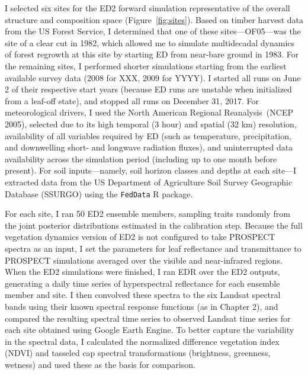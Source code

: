 I selected six sites for the ED2 forward simulation representative of the overall structure and composition space (Figure~\ref{fig:sites}). %
Based on timber harvest data from the US Forest Service, I determined that one of these sites---OF05---was the site of a clear cut in 1982, which allowed me to simulate multidecadal dynamics of forest regrowth at this site by starting ED from near-bare ground in 1983.
For the remaining sites, I performed shorter simulations starting from the earliest available survey data (2008 for XXX, 2009 for YYYY).
I started all runs on June 2 of their respective start years (because ED runs are unstable when initialized from a leaf-off state), and stopped all runs on December 31, 2017.
For meteorological drivers, I used the North American Regional Reanalysis~(NCEP 2005)\nocite{narr}, selected due to its high temporal (3 hour) and spatial (32 km) resolution, availability of all variables required by ED (such as temperature, precipitation, and downwelling short- and longwave radiation fluxes), and uninterrupted data availability across the simulation period (including up to one month before present).
For soil inputs---namely, soil horizon classes and depths at each site---I extracted data from the US Department of Agriculture Soil Survey Geographic Database (SSURGO) using the \texttt{FedData} R package.

For each site, I ran 50 ED2 ensemble members, sampling traits randomly from the joint posterior distributions estimated in the calibration step.
Because the full vegetation dynamics version of ED2 is not configured to take PROSPECT spectra as an input, I set the parameters for leaf reflectance and transmittance to PROSPECT simulations averaged over the visible and near-infrared regions.
When the ED2 simulations were finished, I ran EDR over the ED2 outputs, generating a daily time series of hyperspectral reflectance for each ensemble member and site.
I then convolved these spectra to the six Landsat spectral bands using their known spectral response functions (as in Chapter 2),
and compared the resulting spectral time series to observed Landsat time series for each site obtained using Google Earth Engine.
To better capture the variability in the spectral data, I calculated the normalized difference vegetation index (NDVI) and tasseled cap spectral transformations (brightness, greenness, wetness) and used these as the basis for comparison.
